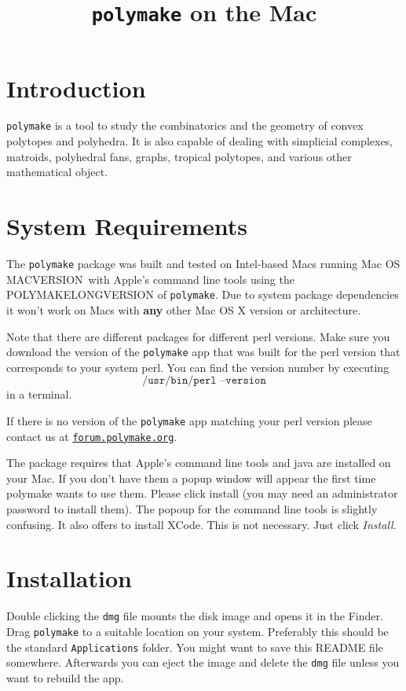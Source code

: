 \documentclass[a4paper]{amsart}
\title{\texttt{polymake} on the Mac\\\polymakeversion}
\newcommand{\macversion}{MACVERSION}
\newcommand{\polymakeversion}{POLYMAKELONGVERSION\xspace}
\newcommand{\polymake}{\texttt{polymake}\xspace}
\begin{document}
\maketitle
\parindent0pt

\section*{Introduction}

\polymake is a tool to study the combinatorics and the geometry of convex polytopes and polyhedra. It is also capable of dealing with simplicial complexes, matroids, polyhedral fans, graphs, tropical polytopes, and various other mathematical object.

\section*{System Requirements}

The \polymake package was built and tested on Intel-based Macs running Mac OS \macversion\ with Apple's command line tools using the \polymakeversion of \polymake. Due to system package dependencies it won't work on Macs with \textbf{any} other Mac OS X version or architecture.

Note that there are different packages for different perl versions. Make sure you download the version of the \polymake app that was built for the perl version that corresponds to your system perl. You can find the version number by executing \[\texttt{/usr/bin/perl --version}\] in a terminal.

If there is no version of the \polymake app matching your perl version please contact us at \href{http://forum.polymake.org}{\tt forum.polymake.org}.

\bigskip
The package requires that Apple's command line tools and java are installed on your Mac. If you don't have them a popup window will appear the first time polymake wants to use them. Please click install (you may need an administrator password to install them). The popoup for the command line tools is slightly confusing. It also offers to install XCode. This is not necessary. Just click \emph{Install}.

\section*{Installation}

Double clicking the \texttt{dmg} file mounts the disk image and opens it in the Finder. Drag \polymake to a suitable location on your system. Preferably this should be the standard \texttt{Applications} folder. You might want to save this README file somewhere. Afterwards you can eject the image and delete the  \texttt{dmg} file unless you want to rebuild the app.
\end{document}
